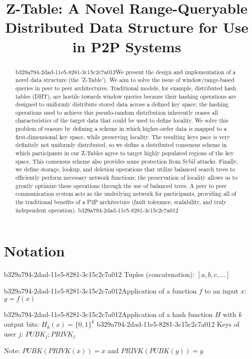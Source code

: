 \documentclass[12pt]{article}
\title{Z-Table: A Novel Range-Queryable Distributed Data Structure for Use in P2P Systems}
\begin{document}
\maketitle

\begin{abstract}
b329a794-2dad-11e5-8281-3c15c2c7a012We present the design and implementation of a novel data structure (the 'Z-Table'). We aim to solve the issue of window/range-based queries in peer to peer architectures. Traditional models, for example,  distributed hash tables (DHT), are hostile towards window queries because their hashing operations are designed to uniformly distribute stored data across a defined key space; the hashing operations used to achieve this pseudo-random distribution inherently erases all characteristics of the target data that could be used to define locality. We solve this problem of erasure by defining a scheme in which higher-order data is mapped to a first-dimensional key space, while preserving locality. The resulting keys pace is very definitely not uniformly distributed, so we define a distributed consensus scheme in which participants in our Z-Tables agree to target highly populated regions of the key space. This consensus scheme also provides some protection from Sybil attacks. Finally, we define storage, lookup, and deletion operations that utilize balanced search trees to efficiently perform necessary network functions; the preservation of locality allows us to greatly optimize these operations through the use of balanced trees. A peer to peer communication system acts as the underlying network for participants, providing all of the traditional benefits of a P2P architecture (fault tolerance, scalability, and truly independent operation).
b329a794-2dad-11e5-8281-3c15c2c7a012\end{abstract}

\section{Notation}
b329a794-2dad-11e5-8281-3c15c2c7a012
Tuples (concatenation): $[a,b,c,...]$

b329a794-2dad-11e5-8281-3c15c2c7a012Application of a function $f$ to an input $x$: $y=f(x)$

b329a794-2dad-11e5-8281-3c15c2c7a012Application of a hash function $H$ with $k$ output bits: $H_{k}(x) = \{0,1\}^k$
b329a794-2dad-11e5-8281-3c15c2c7a012
Keys of user $j$: $ PUBK_j; PRIVK_j $

Note: $PUBK(PRIVK(x)) = x$ and $PRIVK(PUBK(y)) = y$~
\end{document}
